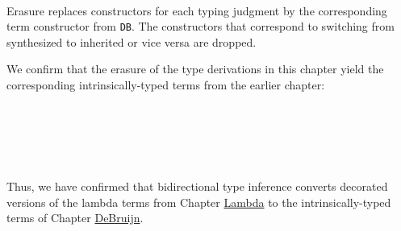 \begin{fence}
\begin{code}
\AgdaSpace{}%
%
\>[21]\AgdaSymbol{=}%
\>[24]\AgdaSpace{}%
\AgdaSpace{}%
\AgdaSpace{}%
\<%
\\
\>[0]\AgdaSpace{}%
\AgdaSpace{}%
\AgdaSpace{}%
\AgdaSpace{}%
%
\>[21]\AgdaSymbol{=}%
\>[24]\AgdaSpace{}%
\AgdaSpace{}%
\<%
\end{code}
\end{fence}

Erasure replaces constructors for each typing judgment by the
corresponding term constructor from \texttt{DB}. The constructors that
correspond to switching from synthesized to inherited or vice versa are
dropped.

We confirm that the erasure of the type derivations in this chapter
yield the corresponding intrinsically-typed terms from the earlier
chapter:

\begin{fence}
\begin{code}%
\>[0]\AgdaFunction{\AgdaUnderscore{}}\AgdaSpace{}%
\AgdaSymbol{:}\AgdaSpace{}%
\AgdaSpace{}%
\AgdaSpace{}%
\AgdaSpace{}%
\AgdaSpace{}%
\<%
\\
\>[0]\AgdaSymbol{\AgdaUnderscore{}}\AgdaSpace{}%
\AgdaSymbol{=}\AgdaSpace{}%
\<%
\\
%
\\[\AgdaEmptyExtraSkip]%
\>[0]\AgdaFunction{\AgdaUnderscore{}}\AgdaSpace{}%
\AgdaSymbol{:}\AgdaSpace{}%
\AgdaSpace{}%
\AgdaSpace{}%
\AgdaSpace{}%
\AgdaSpace{}%
\<%
\\
\>[0]\AgdaSymbol{\AgdaUnderscore{}}\AgdaSpace{}%
\AgdaSymbol{=}\AgdaSpace{}%
\<%
\end{code}
\end{fence}

Thus, we have confirmed that bidirectional type inference converts
decorated versions of the lambda terms from Chapter
\protect\hyperlink{Lambda}{Lambda} to the intrinsically-typed terms of
Chapter \protect\hyperlink{DeBruijn}{DeBruijn}.

